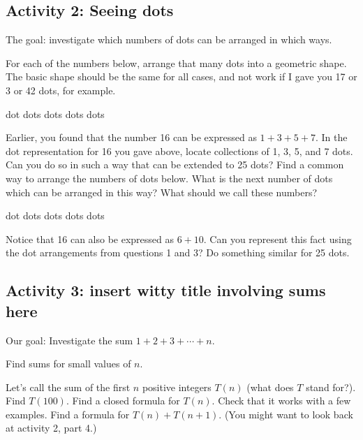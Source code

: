 \documentclass[11pt]{exam}
\begin{document}
\newpage
\subsection*{Activity 2: Seeing dots}
The goal: investigate which numbers of dots can be arranged in which ways.

\begin{questions}
  \question For each of the numbers below, arrange that many dots into a geometric shape.  The basic shape should be the same for all cases, and not work if I gave you 17 or 3 or 42 dots, for example.
\begin{center}
  dot \qquad{} dots \qquad\qquad{} dots \qquad\qquad{} dots \qquad\qquad{} dots  
  \end{center}

  \vfill
  \question Earlier, you found that the number 16 can be expressed as $1 + 3 + 5 + 7$.  In the dot representation for 16 you gave above, locate collections of 1, 3, 5, and 7 dots.  Can you do so in such a way that can be extended to 25 dots?
  \vfill
  \question Find a common way to arrange the numbers of dots below.  What is the next number of dots which can be arranged in this way?  What should we call these numbers?
  \begin{center}
  dot \qquad{} dots \qquad\qquad{} dots \qquad\qquad{} dots \qquad\qquad{} dots  
  \end{center}

  \vfill
  \question Notice that 16 can also be expressed as $6 + 10$.  Can you represent this fact using the dot arrangements from questions 1 and 3?  Do something similar for 25 dots.
  \vfill

\end{questions}

\newpage
\subsection*{Activity 3: \textlangle insert witty title involving sums here\textrangle}
Our goal: Investigate the sum $1 + 2 + 3 + \cdots + n$.
\begin{questions}
  \question Find sums for small values of $n$.
  \question Let's call the sum of the first $n$ positive integers $T(n)$ (what does $T$ stand for?).  Find $T(100)$.
  \vfill
  \question Find a closed formula for $T(n)$.  Check that it works with a few examples.
  \vfill
  \vfill
  \vfill
  \question Find a formula for $T(n) + T(n+1)$.  (You might want to look back at activity 2, part 4.)
  \vfill
\end{questions}
\end{document}
